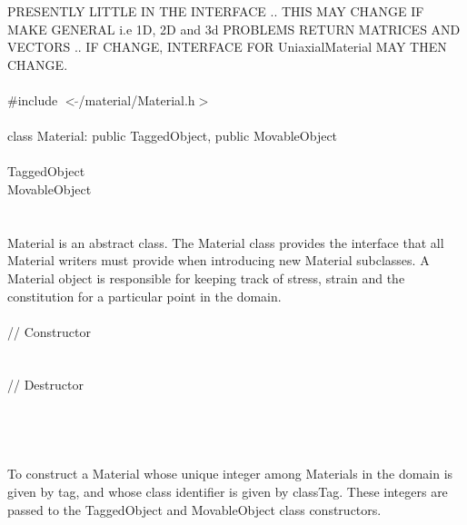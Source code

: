 
PRESENTLY LITTLE IN THE INTERFACE .. THIS MAY CHANGE IF MAKE GENERAL
i.e 1D, 2D and 3d PROBLEMS RETURN MATRICES AND VECTORS .. IF CHANGE,
INTERFACE FOR UniaxialMaterial MAY THEN CHANGE. \\ 

   \\
\indent \#include $<\tilde{ }$/material/Material.h$>$  \\

  \\
\indent class Material: public TaggedObject, public MovableObject \\

 \\
\indent TaggedObject \\
\indent MovableObject \\
\indent{} \\

  \\
\indent Material is an abstract class. The Material class
provides the interface that all Material writers must provide
when introducing new Material subclasses. A Material object
is responsible for keeping track of stress, strain and the
constitution for a particular point in the domain. \\ 

 \\
\indent // Constructor \\
  \\ \\
\indent // Destructor \\
\\ \\

  \\
  \\
To construct a Material whose unique integer among Materials in the
domain is given by \p tag, and whose class identifier is given
by \p classTag. These integers are passed to the TaggedObject and
MovableObject class constructors. \\

 \\
\\ 



